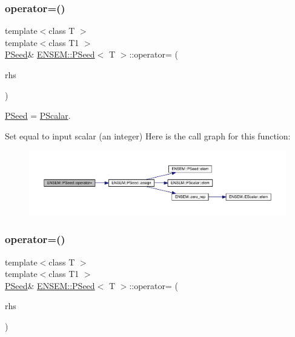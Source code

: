 \subsubsection{\texorpdfstring{operator=()}{operator=()}\hspace{0.1cm}{\footnotesize\ttfamily [1/6]}}
{\footnotesize\ttfamily template$<$class T $>$ \\
template$<$class T1 $>$ \\
\mbox{\hyperlink{classENSEM_1_1PSeed}{P\+Seed}}\& \mbox{\hyperlink{classENSEM_1_1PSeed}{E\+N\+S\+E\+M\+::\+P\+Seed}}$<$ T $>$\+::operator= (\begin{DoxyParamCaption}\item[{const \mbox{\hyperlink{classENSEM_1_1PScalar}{P\+Scalar}}$<$ T1 $>$ \&}]{rhs }\end{DoxyParamCaption})\hspace{0.3cm}{\ttfamily [inline]}}



\mbox{\hyperlink{classENSEM_1_1PSeed}{P\+Seed}} = \mbox{\hyperlink{classENSEM_1_1PScalar}{P\+Scalar}}. 

Set equal to input scalar (an integer) Here is the call graph for this function\+:
\nopagebreak
\begin{figure}[H]
\begin{center}
\leavevmode
\includegraphics[width=350pt]{dc/d14/classENSEM_1_1PSeed_aa7d9ec1f6a7cca8ee109c29d75482350_cgraph}
\end{center}
\end{figure}
\mbox{\label{classENSEM_1_1PSeed_aa7d9ec1f6a7cca8ee109c29d75482350}} 
\subsubsection{\texorpdfstring{operator=()}{operator=()}\hspace{0.1cm}{\footnotesize\ttfamily [2/6]}}
{\footnotesize\ttfamily template$<$class T $>$ \\
template$<$class T1 $>$ \\
\mbox{\hyperlink{classENSEM_1_1PSeed}{P\+Seed}}\& \mbox{\hyperlink{classENSEM_1_1PSeed}{E\+N\+S\+E\+M\+::\+P\+Seed}}$<$ T $>$\+::operator= (\begin{DoxyParamCaption}\item[{const \mbox{\hyperlink{classENSEM_1_1PScalar}{P\+Scalar}}$<$ T1 $>$ \&}]{rhs }\end{DoxyParamCaption})\hspace{0.3cm}{\ttfamily [inline]}}



